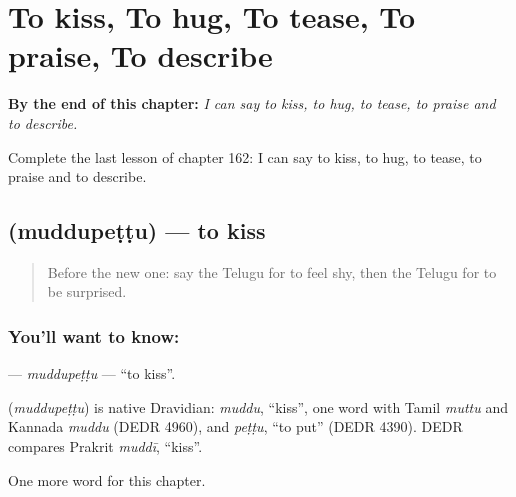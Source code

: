 
\chapter{To kiss, To hug, To tease, To praise, To describe}
\label{ch:te-to-kiss-to-hug-to-tease-to-praise-to-describe}

\begin{chapteropening}
\textbf{By the end of this chapter:} \emph{I can say to kiss, to hug, to tease, to praise and to describe.}

Complete the last lesson of chapter 162: I can say to kiss, to hug, to tease, to praise and to describe.
\end{chapteropening}

\section[\texorpdfstring{\te{ముద్దుపెట్టు} (muddupeṭṭu)}{ముద్దుపెట్టు (muddupeṭṭu)}]{ (muddupeṭṭu) — to kiss}

\label{lesson:TE-C162-muddupettu}



\begin{quote}
Before the new one: say the Telugu for to feel shy, then the Telugu for to be surprised.
\end{quote}

\subsection*{You'll want to know: }
\textbf{} — \emph{muddupeṭṭu} — \textquotedblleft{}to kiss\textquotedblright{}.

\begin{cousinweb}
\textbf{} (\emph{muddupeṭṭu}) is native Dravidian: \emph{muddu}, \textquotedblleft{}kiss\textquotedblright{}, one word with Tamil \emph{muttu} and Kannada \emph{muddu} (DEDR 4960), and \emph{peṭṭu}, \textquotedblleft{}to put\textquotedblright{} (DEDR 4390). DEDR compares Prakrit \emph{muddī}, \textquotedblleft{}kiss\textquotedblright{}.
\end{cousinweb}

\begin{grammarlens}[title={What you've built}]
One more word for this chapter.
\end{grammarlens}


